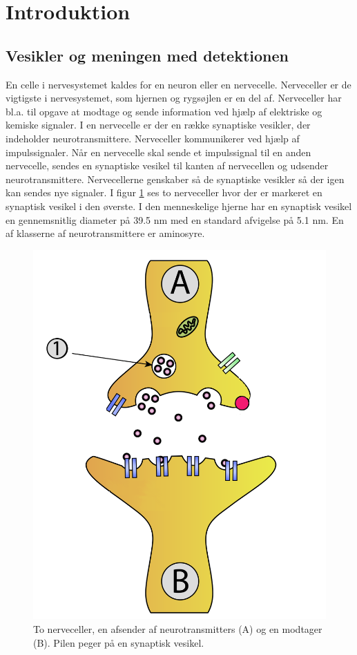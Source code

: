 \thispagestyle{plain}
\section{Introduktion}
\subsection{Vesikler og meningen med detektionen}
\pagestyle{headings}
En celle i nervesystemet kaldes for en neuron eller en nervecelle. Nerveceller er de vigtigste i nervesystemet, som hjernen og rygsøjlen er en del af.
Nerveceller har bl.a. til opgave at modtage og sende information ved hjælp af elektriske og kemiske signaler. I en nervecelle er der en række synaptiske vesikler, der indeholder neurotransmittere. Nerveceller kommunikerer ved hjælp af impulssignaler. Når en nervecelle skal sende et impulssignal til en anden nervecelle, sendes en synaptiske vesikel til kanten af nervecellen og udsender neurotransmittere. Nervecellerne genskaber så de synaptiske vesikler så der igen kan sendes nye signaler. I figur \ref{fig:intro_syntrans} ses to nerveceller hvor der er markeret en synaptisk vesikel i den øverste. I den menneskelige hjerne har en synaptisk vesikel en gennemsnitlig diameter på 39.5 nm med en standard afvigelse på 5.1 nm. En af klasserne af neurotransmittere er aminosyre.
\begin{figure}[H]
	\centering
	\includegraphics[scale=0.2]{files/intro/img/synTransmitter.png}
	\caption{To nerveceller, en afsender af neurotransmitters (A) og en modtager (B). Pilen peger på en synaptisk vesikel.\label{fig:intro_syntrans}\cite{neuron}}
\end{figure} 

